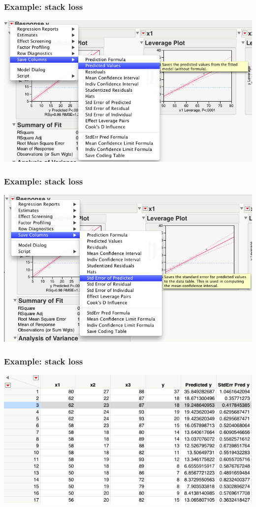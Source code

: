 \documentclass[handout]{beamer}\usepackage[]{graphicx}\usepackage[]{color}
\numberwithin{equation}{section}
\begin{document}
\begin{frame}
\frametitle{Example: stack loss}
 \includegraphics{../../fig/mmc1.png}
\end{frame}

\begin{frame}
\frametitle{Example: stack loss}
 \includegraphics{../../fig/mmc2.png}
\end{frame}

\begin{frame}
\frametitle{Example: stack loss}
 \includegraphics{../../fig/mmc3.png}
\end{frame}
\end{document}
